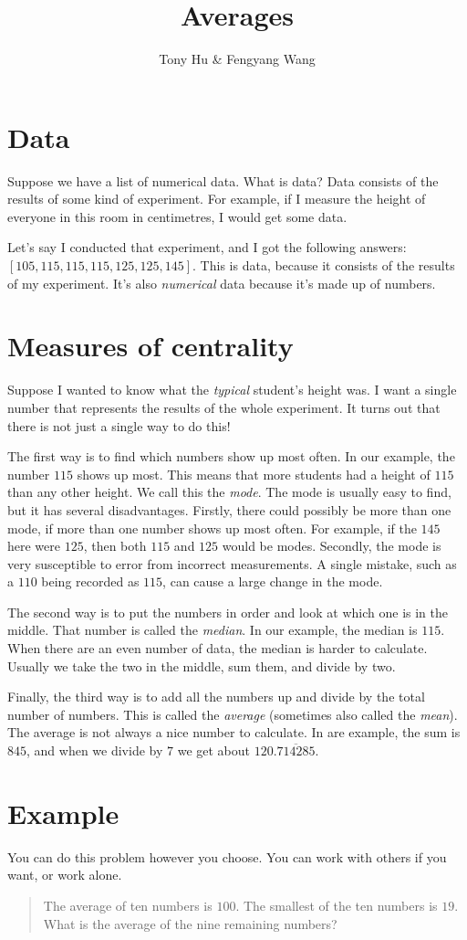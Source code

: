\documentclass[letterpaper,10pt]{article}
\title{Averages}
\author{Tony Hu \& Fengyang Wang}
\begin{document}
\maketitle

\section{Data}

Suppose we have a list of numerical data. What is data? Data  consists of the
results of some kind of experiment. For example, if I measure the height of
everyone in this room in centimetres, I would get some data.

Let's say I conducted that experiment, and I got the following answers: $[105,
115, 115, 115, 125, 125, 145]$. This is data, because it consists of the results
of my experiment. It's also \emph{numerical} data because it's made up of
numbers.

\section{Measures of centrality}

Suppose I wanted to know what the \emph{typical} student's height was. I want a
single number that represents the results of the whole experiment. It turns out
that there is not just a single way to do this!

The first way is to find which numbers show up most often. In our example, the
number $115$ shows up most. This means that more students had a height of $115$
than any other height. We call this the \emph{mode}. The mode is usually easy to
find, but it has several disadvantages. Firstly, there could possibly be more
than one mode, if more than one number shows up most often. For example, if the
$145$ here were $125$, then both $115$ and $125$ would be modes. Secondly, the
mode is very susceptible to error from incorrect measurements. A single mistake,
such as a $110$ being recorded as $115$, can cause a large change in the mode.

The second way is to put the numbers in order and look at which one is in the
middle. That number is called the \emph{median}. In our example, the median is
$115$. When there are an even number of data, the median is harder to calculate.
Usually we take the two in the middle, sum them, and divide by two.

Finally, the third way is to add all the numbers up and divide by the total
number of numbers. This is called the \emph{average} (sometimes also called the
\emph{mean}). The average is not always a nice number to calculate. In are
example, the sum is $845$, and when we divide by $7$ we get about
$120.\overline{714285}$.

\section{Example}
You can do this problem however you choose. You can work with others if you
want, or work alone.

\begin{quotation}
 The average of ten numbers is $100$. The smallest of the ten numbers is $19$.
 What is the average of the nine remaining numbers?
\end{quotation}
\end{document}
